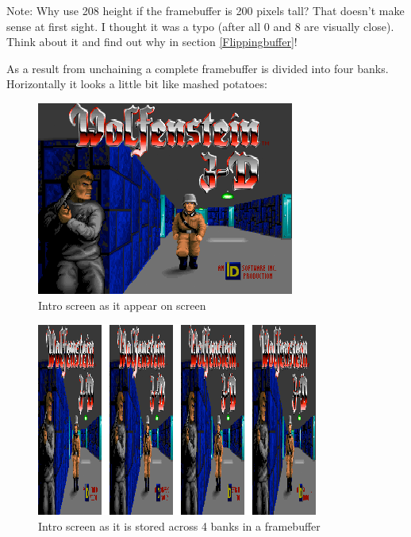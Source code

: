 \documentclass[book.tex]{subfiles}
\begin{document}
Note: Why use 208 height if the framebuffer is 200 pixels tall? That doesn't make sense at first sight. I thought it was a typo (after all 0 and 8 are visually close). Think about it and find out why in section \ref{Flippingbuffer}!\\
\par


As a result from unchaining a complete framebuffer is divided into four banks. Horizontally it looks a little bit like mashed potatoes:
 \begin{figure}[H]
\centering
 \includegraphics[width=\textwidth]{imgs/vga_layout/intro.png}
 \caption{Intro screen as it appear on screen}
 \end{figure}
 \par
 \begin{figure}[H]
\centering
 \includegraphics[width=\textwidth]{imgs/vga_layout/intro_bank.png}
 \caption{Intro screen as it is stored across 4 banks in a framebuffer} \label{fig:vga_layout_for_intro}
 \end{figure}
\end{document}
